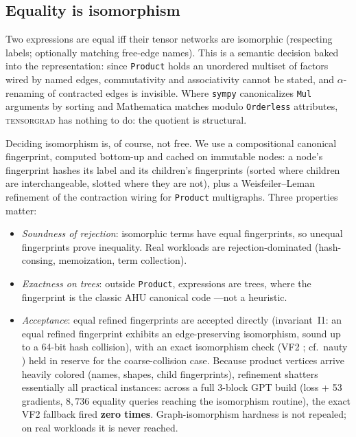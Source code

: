 \documentclass[sigplan,10pt,review]{acmart}
\begin{document}
\subsection{Equality is isomorphism}\label{sec:iso}

Two expressions are equal iff their tensor networks are isomorphic
(respecting labels; optionally matching free-edge names). This is a
semantic decision baked into the representation: since \texttt{Product}
holds an unordered multiset of factors wired by named edges,
commutativity and associativity cannot be stated, and $\alpha$-renaming of
contracted edges is invisible. Where \texttt{sympy} canonicalizes
\texttt{Mul} arguments by sorting and Mathematica matches modulo
\texttt{Orderless} attributes, \textsc{tensorgrad} has nothing to do: the
quotient is structural.

Deciding isomorphism is, of course, not free. We use a compositional
canonical fingerprint, computed bottom-up and cached on immutable nodes:
a node's fingerprint hashes its label and its children's fingerprints
(sorted where children are interchangeable, slotted where they are not),
plus a Weisfeiler--Leman \cite{weisfeiler1968} refinement of the contraction wiring for
\texttt{Product} multigraphs. Three properties matter:

\begin{itemize}
\item \emph{Soundness of rejection}: isomorphic terms have equal
  fingerprints, so unequal fingerprints prove inequality. Real workloads
  are rejection-dominated (hash-consing, memoization, term collection).
\item \emph{Exactness on trees}: outside \texttt{Product}, expressions are
  trees, where the fingerprint is the classic AHU canonical code \cite{aho1974}---not a
  heuristic.
\item \emph{Acceptance}: equal refined fingerprints are accepted directly
  (invariant~I1: an equal refined fingerprint exhibits an edge-preserving
  isomorphism, sound up to a 64-bit hash collision), with an exact
  isomorphism check (VF2 \cite{vf2}; cf.\ nauty \cite{nauty}) held in
  reserve for the coarse-collision case. Because product vertices arrive
  heavily colored (names, shapes, child fingerprints), refinement
  shatters essentially all practical instances: across a full 3-block GPT
  build (loss + 53 gradients, $8{,}736$ equality queries reaching the
  isomorphism routine), the exact VF2 fallback fired \textbf{zero times}.
  Graph-isomorphism hardness is not repealed; on real workloads it is
  never reached.
\end{itemize}
\end{document}
